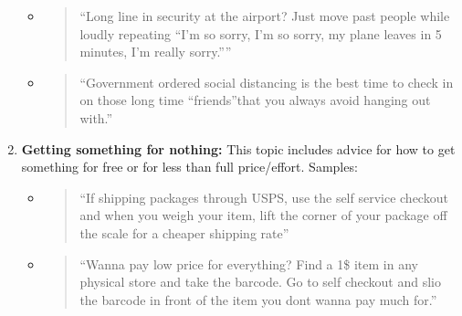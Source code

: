 \documentclass{amsart}
\theoremstyle{definition}
\theoremstyle{remark}
\newcommand{\tql}{\textquotedblleft}
\newcommand{\tqr}{\textquotedblright}
\begin{document}
\begin{enumerate}
\begin{itemize}
\item \begin{quote}
\tql Long line in security at the airport? Just move past people while loudly repeating \tql I'm so sorry, I'm so sorry, my plane leaves in 5 minutes, I'm really sorry.\tqr\tqr
\end{quote}
%
%
%

\item \begin{quote}
\tql Government ordered social distancing is the best time to check in on those long time \tql friends\tqr that you always avoid hanging out with.\tqr
\end{quote}

\end{itemize}

\item \textbf{Getting something for nothing:} This topic includes advice for how to get something for free or for less than full price/effort. Samples:

\begin{itemize}

\item \begin{quote}
\tql If shipping packages through USPS, use the self service checkout and when you weigh your item, lift the corner of your package off the scale for a cheaper shipping rate\tqr
\end{quote}

\item \begin{quote}
\tql Wanna pay low price for everything? Find a 1\$ item in any physical store and take the barcode. Go to self checkout and slio the barcode in front of the item you dont wanna pay much for.\tqr
\end{quote}


\end{itemize}
\end{enumerate}
\end{document}

